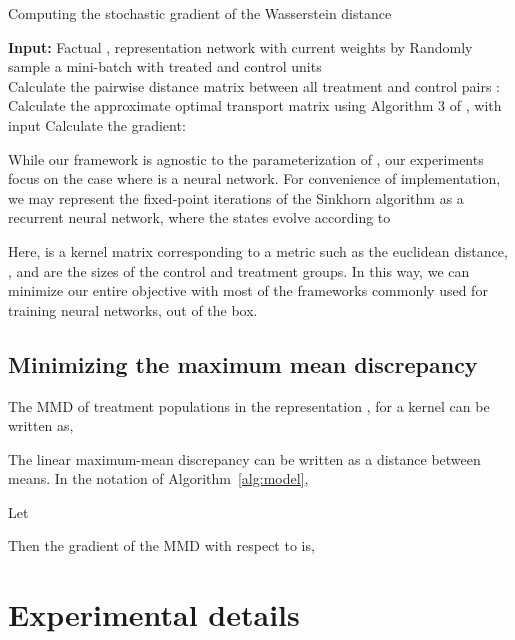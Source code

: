 \documentclass{article}
\begin{document}
\begin{algorithm}[tbp]
\caption{Computing the stochastic gradient of the Wasserstein distance}
\label{alg:wassgrad}
\begin{algorithmic}[1]
  \STATE \textbf{Input:} Factual  , representation network  with current weights by 
  \STATE Randomly sample a mini-batch with  treated and  control units \\
  
   \STATE Calculate the  pairwise distance matrix between all treatment and control pairs : \\
   
    \STATE Calculate the approximate optimal transport matrix  using Algorithm 3 of \citet{cuturi2014fast}, with input 
  \STATE Calculate the gradient:\\ 
  \vspace{0.2em}
\end{algorithmic}
\end{algorithm}



While our framework is agnostic to the parameterization of , our experiments focus on the case where  is a neural network. For convenience of implementation, we may represent the fixed-point iterations of the Sinkhorn algorithm as a recurrent neural network, where the states  evolve according to

Here,  is a kernel matrix corresponding to a metric such as the euclidean distance, , and  are the sizes of the control and treatment groups. In this way, we can minimize our entire objective with most of the frameworks commonly used for training neural networks, out of the box.

\subsection{Minimizing the maximum mean discrepancy}

The MMD of treatment populations in the representation , for a kernel  can be written as,





The linear maximum-mean discrepancy can be written as a distance between means. In the notation of Algorithm~\ref{alg:model},

Let

Then the gradient of the MMD with respect to  is,


 \section{Experimental details}\label{sec:appexp}
\end{document}
